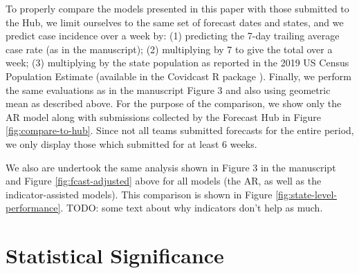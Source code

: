 
To properly compare the models presented in this paper with those submitted to
the Hub, we limit ourselves to the same set of forecast dates and states, and
we predict case incidence over a week by: (1) predicting the 7-day trailing
average case rate (as in the manuscript);
(2) multiplying by 7 to give the total over a week; (3) multiplying by the state
population as reported in the 2019 US Census Population Estimate (available in
the Covidcast R package \cite{CovidcastR}). Finally, we perform the same
evaluations as in the manuscript Figure 3 and also using geometric mean as
described above.
For the purpose of the comparison, we show only the AR model along with
submissions collected by the Forecast Hub in Figure \ref{fig:compare-to-hub}.
Since not all teams submitted forecasts for the entire period, we
only display those which submitted for at least 6 weeks. 



We also are undertook the same analysis shown in Figure 3 in the manuscript and Figure
\ref{fig:fcast-adjusted} above for all models
(the AR, as well as the indicator-assisted models). This comparison is shown in Figure
\ref{fig:state-level-performance}. 
%
TODO: some text about why indicators don't help as much.


\section{Statistical Significance}

